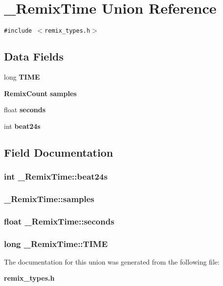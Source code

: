 \section{\_\-Remix\-Time Union Reference}
\label{union__RemixTime}
{\tt \#include $<$remix\_\-types.h$>$}

\subsection*{Data Fields}
\begin{CompactItemize}
\item 
long {\bf TIME}
\item 
{\bf Remix\-Count} {\bf samples}
\item 
float {\bf seconds}
\item 
int {\bf beat24s}
\end{CompactItemize}


\subsection{Field Documentation}
\subsubsection{\setlength{\rightskip}{0pt plus 5cm}int {\bf \_\-Remix\-Time::beat24s}}\label{union__RemixTime_o3}


\subsubsection{ {\bf \_\-Remix\-Time::samples}}\label{union__RemixTime_o1}


\subsubsection{\setlength{\rightskip}{0pt plus 5cm}float {\bf \_\-Remix\-Time::seconds}}\label{union__RemixTime_o2}


\subsubsection{\setlength{\rightskip}{0pt plus 5cm}long {\bf \_\-Remix\-Time::TIME}}\label{union__RemixTime_o0}




The documentation for this union was generated from the following file:\begin{CompactItemize}
\item 
{\bf remix\_\-types.h}\end{CompactItemize}
